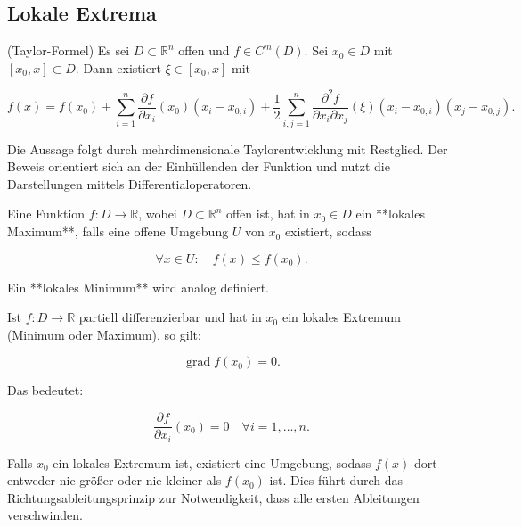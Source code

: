 \subsection{Lokale Extrema}

\begin{satz}{}
(Taylor-Formel)  
Es sei $D \subset \mathbb{R}^n$ offen und $ f \in C^m(D) $. Sei $ x_0 \in D $ mit $ [x_0, x] \subset D $. Dann existiert $ \xi \in [x_0, x] $ mit


$$
f(x) = f(x_0) + \sum_{i=1}^{n} \frac{\partial f}{\partial x_i}(x_0) (x_i - x_{0,i}) + \frac{1}{2} \sum_{i,j=1}^{n} \frac{\partial^2 f}{\partial x_i \partial x_j} (\xi) (x_i - x_{0,i}) (x_j - x_{0,j}).
$$


\end{satz}

\begin{beweisbox}
Die Aussage folgt durch mehrdimensionale Taylorentwicklung mit Restglied. Der Beweis orientiert sich an der Einhüllenden der Funktion und nutzt die Darstellungen mittels Differentialoperatoren.  
\end{beweisbox}

\begin{definition}{}
Eine Funktion $ f: D \to \mathbb{R} $, wobei $ D \subset \mathbb{R}^n $ offen ist, hat in $ x_0 \in D $ ein **lokales Maximum**, falls eine offene Umgebung $ U $ von $ x_0 $ existiert, sodass


$$
\forall x \in U: \quad f(x) \leq f(x_0).
$$


Ein **lokales Minimum** wird analog definiert.
\end{definition}

\begin{lemma}{}
Ist $ f: D \to \mathbb{R} $ partiell differenzierbar und hat in $ x_0 $ ein lokales Extremum (Minimum oder Maximum), so gilt:


$$
\operatorname{grad} f(x_0) = 0.
$$


Das bedeutet:


$$
\frac{\partial f}{\partial x_i} (x_0) = 0 \quad \forall i=1,\dots,n.
$$


\end{lemma}

\begin{beweisbox}
Falls $ x_0 $ ein lokales Extremum ist, existiert eine Umgebung, sodass $ f(x) $ dort entweder nie größer oder nie kleiner als $ f(x_0) $ ist. Dies führt durch das Richtungsableitungsprinzip zur Notwendigkeit, dass alle ersten Ableitungen verschwinden.
\end{beweisbox}

